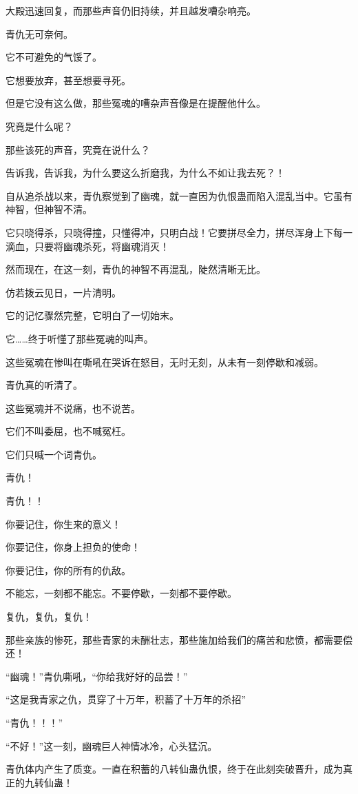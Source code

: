 \begin{this_body}
大殿迅速回复，而那些声音仍旧持续，并且越发嘈杂响亮。

青仇无可奈何。

它不可避免的气馁了。

它想要放弃，甚至想要寻死。

但是它没有这么做，那些冤魂的嘈杂声音像是在提醒他什么。

究竟是什么呢？

那些该死的声音，究竟在说什么？

告诉我，告诉我，为什么要这么折磨我，为什么不如让我去死？！

自从追杀战以来，青仇察觉到了幽魂，就一直因为仇恨蛊而陷入混乱当中。它虽有神智，但神智不清。

它只晓得杀，只晓得撞，只懂得冲，只明白战！它要拼尽全力，拼尽浑身上下每一滴血，只要将幽魂杀死，将幽魂消灭！

然而现在，在这一刻，青仇的神智不再混乱，陡然清晰无比。

仿若拨云见日，一片清明。

它的记忆骤然完整，它明白了一切始末。

它……终于听懂了那些冤魂的叫声。

这些冤魂在惨叫在嘶吼在哭诉在怒目，无时无刻，从未有一刻停歇和减弱。

青仇真的听清了。

这些冤魂并不说痛，也不说苦。

它们不叫委屈，也不喊冤枉。

它们只喊一个词青仇。

青仇！

青仇！！

你要记住，你生来的意义！

你要记住，你身上担负的使命！

你要记住，你的所有的仇敌。

不能忘，一刻都不能忘。不要停歇，一刻都不要停歇。

复仇，复仇，复仇！

那些亲族的惨死，那些青家的未酬壮志，那些施加给我们的痛苦和悲愤，都需要偿还！

“幽魂！”青仇嘶吼，“你给我好好的品尝！”

“这是我青家之仇，贯穿了十万年，积蓄了十万年的杀招”

“青仇！！！”

“不好！”这一刻，幽魂巨人神情冰冷，心头猛沉。

青仇体内产生了质变。一直在积蓄的八转仙蛊仇恨，终于在此刻突破晋升，成为真正的九转仙蛊！


\end{this_body}
